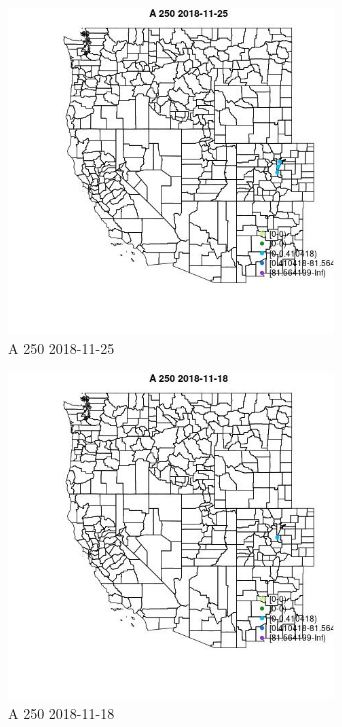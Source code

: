 \begin{figure} 
\centering  
\includegraphics[width=0.77\textwidth]{Code_Outputs/Report_ML_input_PM25_Step4_part_e_de_duplicated_aveswNAs_MapObsA_2502018-11-25.jpg} 
\caption{\label{fig:Report_ML_input_PM25_Step4_part_e_de_duplicated_aveswNAsMapObsA_2502018-11-25}A 250 2018-11-25} 
\end{figure} 
 

\clearpage 

\begin{figure} 
\centering  
\includegraphics[width=0.77\textwidth]{Code_Outputs/Report_ML_input_PM25_Step4_part_e_de_duplicated_aveswNAs_MapObsA_2502018-11-18.jpg} 
\caption{\label{fig:Report_ML_input_PM25_Step4_part_e_de_duplicated_aveswNAsMapObsA_2502018-11-18}A 250 2018-11-18} 
\end{figure} 
 

